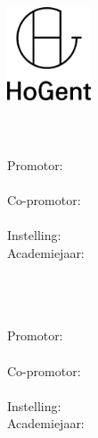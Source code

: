 \begin{titlepage}
	
	\begin{center}
		\begingroup
			\rmfamily
			\includegraphics[width=2.5cm]{img/HG-beeldmerk-woordmerk}\\[.5cm]
			\faculteit\\[3cm]
			\titel
			\vfill
			\student\\[3.5cm]
			\rapporttype\\[2cm]
			Promotor:\\ \promotor\\
			Co-promotor:\\ \copromotor\\[2.5cm]
			Instelling: \instelling\\[.5cm]
			Academiejaar: \academiejaar\\[.5cm]
			\examenperiode
		\endgroup
	\end{center}
	
	\restoregeometry
\end{titlepage}

\emptypage

\begin{titlepage}
	
	\begin{center}
		\begingroup
			\rmfamily
			\faculteit\\[3cm]
			\titel
			\vfill
			\student\\[3.5cm]
			\rapporttype\\[2cm]
			Promotor:\\ \promotor\\
			Co-promotor:\\ \copromotor\\[2.5cm]
			Instelling: \instelling\\[.5cm]
			Academiejaar: \academiejaar\\[.5cm]
			\examenperiode
		\endgroup
	\end{center}
	
	\restoregeometry
\end{titlepage}
